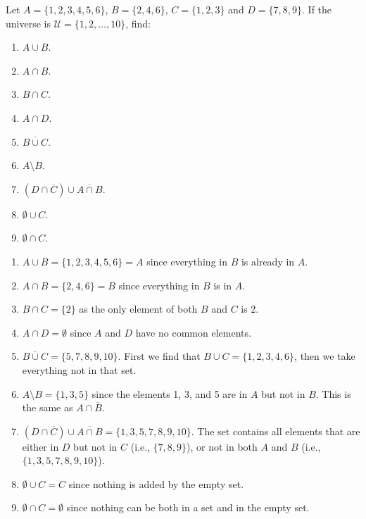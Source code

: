 \documentclass[11pt,]{book}
\theoremstyle{ptxplainnotitle}
\theoremstyle{ptxplaintitle}
\theoremstyle{ptxdefinitionnotitle}
\theoremstyle{ptxdefinitiontitle}
\theoremstyle{ptxdefinitionnotitle}
\theoremstyle{ptxdefinitiontitle}
\theoremstyle{ptxdefinitionnotitle}
\theoremstyle{ptxdefinitiontitle}
\theoremstyle{ptxdefinitiontitlenonumber}
\theoremstyle{ptxdefinitiontitlenonumber}
\numberwithin{equation}{chapter}
\newcommand{\U}{\mathcal U}
\renewcommand{\bar}{\overline}
\begin{document}
\begin{example}\label{example-32}
\hypertarget{p-754}{}%
Let \(A = \{1, 2, 3, 4, 5, 6\}\), \(B = \{2, 4, 6\}\), \(C = \{1, 2, 3\}\) and \(D = \{7, 8, 9\}\). If the universe is \(\U = \{1, 2, \ldots, 10\}\), find: \leavevmode%
\begin{enumerate}
\item\hypertarget{li-315}{}\(A \cup B\).%
\item\hypertarget{li-316}{}\(A \cap B\).%
\item\hypertarget{li-317}{}\(B \cap C\).%
\item\hypertarget{li-318}{}\(A \cap D\).%
\item\hypertarget{li-319}{}\(\bar{B \cup C}\).%
\item\hypertarget{li-320}{}\(A \setminus B\).%
\item\hypertarget{li-321}{}\((D \cap \bar C) \cup \bar{A \cap B}\).%
\item\hypertarget{li-322}{}\(\emptyset \cup C\).%
\item\hypertarget{li-323}{}\(\emptyset \cap C\).%
\end{enumerate}
%
\par\smallskip%
\noindent\textbf{}\hypertarget{solution-107}{}\hypertarget{p-755}{}%
\leavevmode%
\begin{enumerate}
\item\hypertarget{li-324}{}\(A \cup B = \{1, 2, 3, 4, 5, 6\} = A\) since everything in \(B\) is already in \(A\).%
\item\hypertarget{li-325}{}\(A \cap B = \{2, 4, 6\} = B\) since everything in \(B\) is in \(A\).%
\item\hypertarget{li-326}{}\(B \cap C = \{2\}\) as the only element of both \(B\) and \(C\) is 2.%
\item\hypertarget{li-327}{}\(A \cap D = \emptyset\) since \(A\) and \(D\) have no common elements.%
\item\hypertarget{li-328}{}\(\bar{B \cup C} = \{5, 7, 8, 9, 10\}\). First we find that \(B \cup C = \{1, 2, 3, 4, 6\}\), then we take everything not in that set.%
\item\hypertarget{li-329}{}\(A \setminus B = \{1, 3, 5\}\) since the elements 1, 3, and 5 are in \(A\) but not in \(B\). This is the same as \(A \cap \bar B\).%
\item\hypertarget{li-330}{}\((D \cap \bar C) \cup \bar{A \cap B} = \{1, 3, 5, 7, 8, 9, 10\}.\) The set contains all elements that are either in \(D\) but not in \(C\) (i.e., \(\{7,8,9\}\)), or not in both \(A\) and \(B\) (i.e., \(\{1,3,5,7,8,9,10\}\)).%
\item\hypertarget{li-331}{}\(\emptyset \cup C = C\) since nothing is added by the empty set.%
\item\hypertarget{li-332}{}\(\emptyset \cap C = \emptyset\) since nothing can be both in a set and in the empty set.%
\end{enumerate}
%
\end{example}
\end{document}
